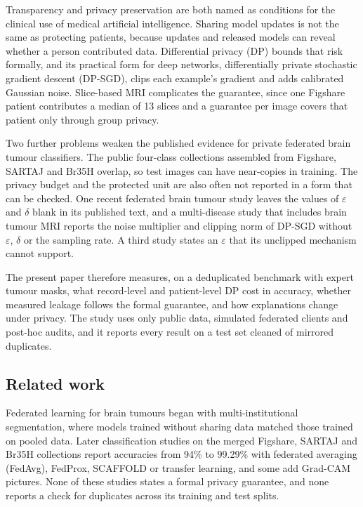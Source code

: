 \documentclass[preprint,12pt]{elsarticle}
\begin{document}
Transparency and privacy preservation are both named as conditions for the clinical use of medical artificial
intelligence.\cite{cai2025} Sharing model updates is not the same as protecting patients, because updates and released
models can reveal whether a person contributed data.\cite{pati2024,knolle2026} Differential privacy (DP) bounds that risk formally,
and its practical form for deep networks, differentially private stochastic gradient descent (DP-SGD), clips each
example's gradient and adds calibrated Gaussian noise.\cite{abadi2016} Slice-based MRI complicates the guarantee,
since one Figshare patient contributes a median of 13 slices and a guarantee per image covers that patient only
through group privacy.

Two further problems weaken the published evidence for private federated brain tumour classifiers. The public
four-class collections assembled from Figshare, SARTAJ and Br35H overlap, so test images can have near-copies in
training.\cite{vangala2026} The privacy budget and the protected unit are also often not reported in a
form that can be checked. One recent federated brain tumour study leaves the values of $\varepsilon$ and $\delta$
blank in its published text,\cite{lakshmi2026} and a multi-disease study that includes brain tumour MRI reports the
noise multiplier and clipping norm of DP-SGD without $\varepsilon$, $\delta$ or the sampling rate.\cite{qazi2026} A
third study states an $\varepsilon$ that its unclipped mechanism cannot support.\cite{gupta2026}

The present paper therefore measures, on a deduplicated benchmark with expert tumour masks, what record-level and
patient-level DP cost in accuracy, whether measured leakage follows the formal guarantee, and how explanations
change under privacy. The study uses only public data, simulated federated clients and post-hoc audits, and it
reports every result on a test set cleaned of mirrored duplicates.

\subsection{Related work}
Federated learning for brain tumours began with multi-institutional segmentation, where models trained without
sharing data matched those trained on pooled data.\cite{sheller2019,sheller2020,pati2022} Later classification
studies on the merged Figshare, SARTAJ and Br35H collections report accuracies from 94\% to 99.29\% with federated
averaging (FedAvg),\cite{mcmahan2017} FedProx, SCAFFOLD or transfer learning, and some add Grad-CAM
pictures.\cite{albalawi2024,mastoi2025,muntaqim2025,paul2026} None of these studies states a formal privacy guarantee,
and none reports a check for duplicates across its training and test splits.
\end{document}
